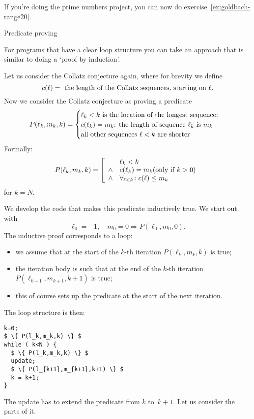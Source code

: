If you're doing the prime numbers project,
you can now do exercise~\ref{ex:goldbach-range20}.

 {Predicate proving}

For programs that have a clear loop structure you can take
an approach that is similar to doing a `proof by induction'.

Let us consider the Collatz conjecture again,
where for brevity we define
\[ c(\ell)=\hbox{ the length of the Collatz sequences, starting on $\ell$}. \]
Now we consider the Collatz conjecture as proving a predicate
\[ P(\ell_k,m_k,k) =
\begin{cases}
  \hbox{$\ell_k<k$ is the location of the longest sequence:}\\
  \hbox{$c(\ell_k)=m_k$: the length of sequence $\ell_k$ is $m_k$}\\
  \hbox{all other sequences $\ell<k$ are shorter}\\  
\end{cases}
\]
Formally:
\[ P(\ell_k,m_k,k) =
\left[
\begin{array}{cl}
  &\ell_k<k\\
  \wedge & c(\ell_k)=m_k \hbox{(only if $k>0$)} \\
  \wedge & \forall_{\ell<k}\colon c(\ell)\leq m_k\\
\end{array} \right.
\]
for $k=N$.

We develop the code that makes this predicate inductively true.
We start out with
\[ \ell_0=-1, \quad m_0=0 \Rightarrow P(\ell_0,m_0,0). \]
The inductive proof corresponds to a loop:
\begin{itemize}
\item we assume that at the start of the $k$-th iteration
  $P(\ell_k,m_k,k)$ is true;
\item the iteration body is such that at the end of the $k$-th iteration
  $P(\ell_{k+1},m_{k+1},k+1)$ is true;
\item this of course sets up the predicate at the start of the next iteration.
\end{itemize}

The loop structure is then:
\begin{lstlisting}[mathescape=true]
k=0;
$ \{ P(l_k,m_k,k) \} $
while ( k<N ) {
  $ \{ P(l_k,m_k,k) \} $
  update;
  $ \{ P(l_{k+1},m_{k+1},k+1) \} $
  k = k+1;
}
\end{lstlisting}
The update has to extend the predicate from $k$ to~$k+1$.
Let us consider the parts of it.

